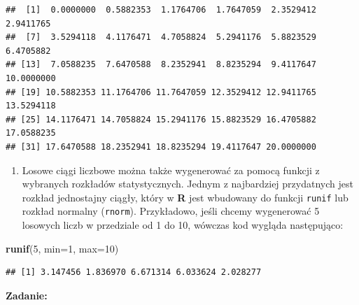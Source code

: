 \documentclass[]{book}
\newenvironment{Shaded}{\begin{snugshade}}{\end{snugshade}}
\newcommand{\KeywordTok}[1]{\textcolor[rgb]{0.13,0.29,0.53}{\textbf{#1}}}
\newcommand{\DataTypeTok}[1]{\textcolor[rgb]{0.13,0.29,0.53}{#1}}
\newcommand{\DecValTok}[1]{\textcolor[rgb]{0.00,0.00,0.81}{#1}}
\newcommand{\NormalTok}[1]{#1}
\providecommand{\tightlist}{%
  \setlength{\itemsep}{0pt}\setlength{\parskip}{0pt}}
\theoremstyle{definition}
\theoremstyle{definition}
\theoremstyle{definition}
\theoremstyle{remark}
\begin{document}
\begin{verbatim}
##  [1]  0.0000000  0.5882353  1.1764706  1.7647059  2.3529412  2.9411765
##  [7]  3.5294118  4.1176471  4.7058824  5.2941176  5.8823529  6.4705882
## [13]  7.0588235  7.6470588  8.2352941  8.8235294  9.4117647 10.0000000
## [19] 10.5882353 11.1764706 11.7647059 12.3529412 12.9411765 13.5294118
## [25] 14.1176471 14.7058824 15.2941176 15.8823529 16.4705882 17.0588235
## [31] 17.6470588 18.2352941 18.8235294 19.4117647 20.0000000
\end{verbatim}

\begin{enumerate}
\def\labelenumi{\arabic{enumi}.}
\setcounter{enumi}{2}
\tightlist
\item
  Losowe ciągi liczbowe można także wygenerować za pomocą funkcji z
  wybranych rozkładów statystycznych. Jednym z najbardziej przydatnych
  jest rozkład jednostajny ciągły, który w \textbf{R} jest wbudowany do
  funkcji \texttt{runif} lub rozkład normalny (\texttt{rnorm}).
  Przykładowo, jeśli chcemy wygenerować 5 losowych liczb w przedziale od
  1 do 10, wówczas kod wygląda następująco:
\end{enumerate}

\begin{Shaded}
\begin{Highlighting}[]
\KeywordTok{runif}\NormalTok{(}\DecValTok{5}\NormalTok{, }\DataTypeTok{min=}\DecValTok{1}\NormalTok{, }\DataTypeTok{max=}\DecValTok{10}\NormalTok{)}
\end{Highlighting}
\end{Shaded}

\begin{verbatim}
## [1] 3.147456 1.836970 6.671314 6.033624 2.028277
\end{verbatim}

\textbf{Zadanie:}
\end{document}
